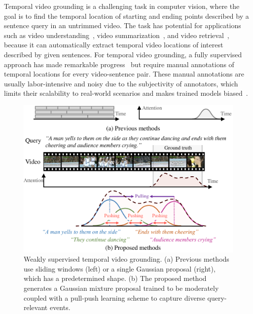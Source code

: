 Temporal video grounding is a challenging task in computer vision, where the goal is to find the temporal location of starting and ending points described by a sentence query in an untrimmed video.
The task has potential for applications such as video understanding~\cite{carreira2017quo}, video summarization~\cite{ma2002user}, and video retrieval~\cite{dong2019dual}, because it can automatically extract temporal video locations of interest described by given sentences.
For temporal video grounding, a fully supervised approach has made remarkable progress~\cite{kim2021plrn,kim2022swag,gao2017tall}
but require manual annotations of temporal locations for every video-sentence pair.
These manual annotations are usually labor-intensive and noisy due to the subjectivity of annotators, which limits their scalability to real-world scenarios and makes trained models biased~\cite{yuan2021closer, zhou2021embracing}.


\begin{figure}[t!]
  \centering
  \includegraphics[width=\linewidth]{figures/0-concept-art.pdf}
  \caption{Weakly supervised temporal video grounding. (a) Previous methods use sliding windows (left) or a single Gaussian proposal (right), which has a predetermined shape. (b) The proposed method generates a Gaussian mixture proposal trained to be moderately coupled with a pull-push learning scheme to capture diverse query-relevant events.
  }
\label{fig:concept-art}
\end{figure}

